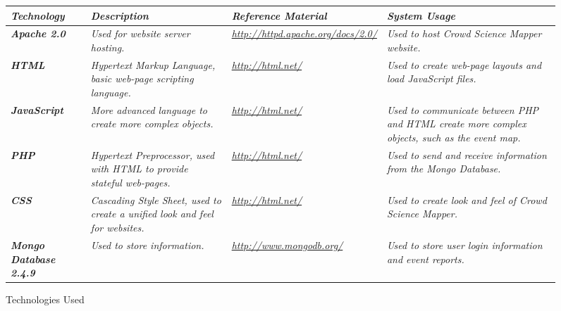 \begin{figure}[tbhp!]
\caption{Technologies Used \label{technologies}}
\begin{center}
\begin{tabular}{|>{\raggedright}p{2cm}|>{\raggedright}p{4cm}|>{\raggedright}p{4cm}|>{\raggedright}p{4cm}|}

  \hline
\textit{\textbf{Technology}} &  \textit{\textbf{Description}} & \textit{\textbf{Reference Material}} & \textit{\textbf{System Usage}}\tabularnewline
\hline
 \textit{\textbf{Apache 2.0}} & \textit{Used for website server hosting.} & \textit{\url{http://httpd.apache.org/docs/2.0/}} & \textit{Used to host Crowd Science Mapper website.}\tabularnewline
\hline
 \textit{\textbf{HTML}} & \textit{Hypertext Markup Language, basic web-page scripting language.} & \textit{\url{http://html.net/}} & \textit{Used to create web-page layouts and load JavaScript files.}\tabularnewline
 \hline
  \textit{\textbf{JavaScript}} & \textit{More advanced language to create more complex objects.} & \textit{\url{http://html.net/}} & \textit{Used to communicate between PHP and HTML create more complex objects, such as the event map.}\tabularnewline
 \hline
  \textit{\textbf{PHP}} & \textit{Hypertext Preprocessor, used with HTML to provide stateful web-pages.} & \textit{\url{http://html.net/}} & \textit{Used to send and receive information from the Mongo Database.}\tabularnewline
 \hline
  \textit{\textbf{CSS}} & \textit{Cascading Style Sheet, used to create a unified look and feel for websites.} & \textit{\url{http://html.net/}} & \textit{Used to create look and feel of Crowd Science Mapper.}\tabularnewline
 \hline
  \textit{\textbf{Mongo Database 2.4.9}} & \textit{Used to store information.} & \textit{\url{http://www.mongodb.org/}} & \textit{Used to store user login information and event reports.}\tabularnewline
\hline
\end{tabular}
\end{center}
\end{figure}

